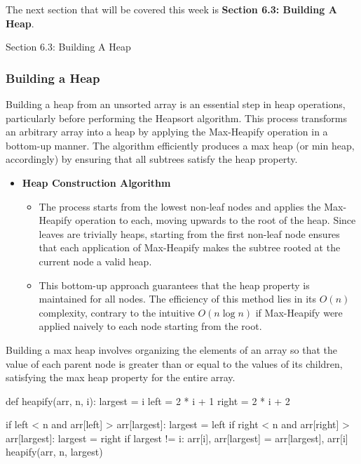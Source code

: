 The next section that will be covered this week is \textbf{Section 6.3: Building A Heap}.

\begin{notes}{Section 6.3: Building A Heap}
    \subsubsection*{Building a Heap}

    Building a heap from an unsorted array is an essential step in heap operations, particularly before performing the Heapsort algorithm. This process transforms an arbitrary array into a heap by 
    applying the Max-Heapify operation in a bottom-up manner. The algorithm efficiently produces a max heap (or min heap, accordingly) by ensuring that all subtrees satisfy the heap property.
    
    \begin{itemize}
        \item \textbf{Heap Construction Algorithm}
        \begin{itemize}
            \item The process starts from the lowest non-leaf nodes and applies the Max-Heapify operation to each, moving upwards to the root of the heap. Since leaves are trivially heaps, starting 
            from the first non-leaf node ensures that each application of Max-Heapify makes the subtree rooted at the current node a valid heap.
            \item This bottom-up approach guarantees that the heap property is maintained for all nodes. The efficiency of this method lies in its $O(n)$ complexity, contrary to the intuitive 
            $O(n \log n)$ if Max-Heapify were applied naively to each node starting from the root.
        \end{itemize}
    \end{itemize}
    
    \begin{highlight}
        Building a max heap involves organizing the elements of an array so that the value of each parent node is greater than or equal to the values of its children, satisfying the max heap property 
        for the entire array.
    \begin{code}[Python]
    def heapify(arr, n, i):
        largest = i
        left = 2 * i + 1
        right = 2 * i + 2
    
        if left < n and arr[left] > arr[largest]:
            largest = left
        if right < n and arr[right] > arr[largest]:
            largest = right
        if largest != i:
            arr[i], arr[largest] = arr[largest], arr[i]
            heapify(arr, n, largest)
    

\end{code}
\end{highlight}
\end{notes}

